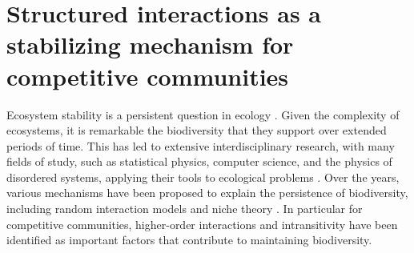 \chapter{Structured interactions as a stabilizing mechanism for competitive communities}\label{chp:1}



Ecosystem stability is a persistent question in ecology \cite{May1972,Chesson2018,Allesina2015}. Given the complexity of ecosystems, it is remarkable the biodiversity that they support over extended periods of time. This has led to extensive interdisciplinary research, with many fields of study, such as statistical physics, computer science, and the physics of disordered systems, applying their tools to ecological problems \cite{Bunin2017Ecological,Sidhom2020Ecological,azaele2016neutral}. Over the years, various mechanisms have been proposed to explain the persistence of biodiversity, including random interaction models \cite{May1972} and niche theory \cite{Chesson2018,Bartomeus2018a}. In particular for competitive communities,  higher-order interactions \cite{Grilli2017Higher-orderModels,Losapio2019,Levine2017BeyondCommunities,battiston2021physics} and intransitivity \cite{may1975nonlinear,Laird2009, kerr2002local,maynard2017diversity,buss1979competitive} have been identified as important factors that contribute to maintaining biodiversity.\\

